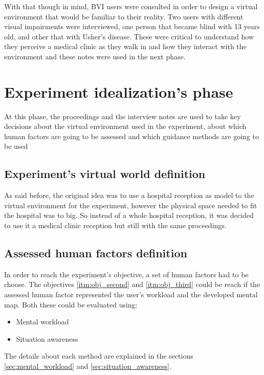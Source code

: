         With that though in mind, BVI users were consulted in order to design a virtual environment that would be familiar to their reality. Two users with different visual impairments were interviewed, one person that became blind with 13 years old, and other that with Usher's disease. These were critical to understand how they perceive a medical clinic as they walk in and how they interact with the environment and these notes were used in the next phase.

\section{Experiment idealization's phase}
\label{sec:idealization_phase}
    At this phase, the proceedings and the interview notes are used to take key decisions about the virtual environment used in the experiment, about which human factors are going to be assessed and which guidance methods are going to be used
    

    \subsection{Experiment's virtual world definition}
        As said before, the original idea was to use a hospital reception as model to the virtual environment for the experiment, however the physical space needed to fit the hospital was to big. So instead of a whole hospital reception, it was decided to use it a medical clinic reception but still with the same proceedings.

    \subsection{Assessed human factors definition}
        In order to reach the experiment's objective, a set of human factors had to be choose. The objectives \ref{itm:obj_second} and \ref{itm:obj_third} could be reach if the assessed human factor represented the user's workload and the developed mental map. Both these could be evaluated using:

        \begin{itemize}
            \item Mental workload
            \item Situation awareness
        \end{itemize}
        
        The details about each method are explained in the sections \ref{sec:mental_workload} and \ref{sec:situation_awareness}.


